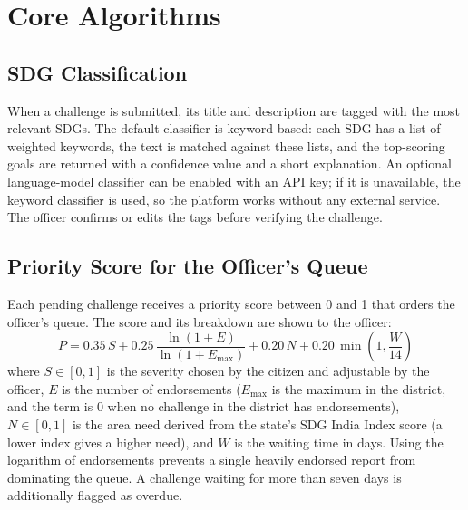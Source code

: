 \section{Core Algorithms}

\subsection{SDG Classification}
When a challenge is submitted, its title and description are tagged with the most relevant SDGs. The default classifier is keyword-based: each SDG has a list of weighted keywords, the text is matched against these lists, and the top-scoring goals are returned with a confidence value and a short explanation. An optional language-model classifier can be enabled with an API key; if it is unavailable, the keyword classifier is used, so the platform works without any external service. The officer confirms or edits the tags before verifying the challenge.

\subsection{Priority Score for the Officer's Queue}
Each pending challenge receives a priority score between 0 and 1 that orders the officer's queue. The score and its breakdown are shown to the officer:
\begin{equation}
P = 0.35\,S + 0.25\,\frac{\ln(1+E)}{\ln(1+E_{\max})} + 0.20\,N + 0.20\,\min\!\left(1, \frac{W}{14}\right)
\end{equation}
where $S\in[0,1]$ is the severity chosen by the citizen and adjustable by the officer, $E$ is the number of endorsements ($E_{\max}$ is the maximum in the district, and the term is 0 when no challenge in the district has endorsements), $N\in[0,1]$ is the area need derived from the state's SDG India Index score (a lower index gives a higher need), and $W$ is the waiting time in days. Using the logarithm of endorsements prevents a single heavily endorsed report from dominating the queue. A challenge waiting for more than seven days is additionally flagged as overdue.

